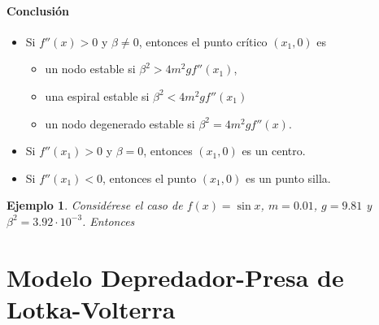 \documentclass[11pt,letterpaper,draft]{report}
\newtheorem{exa}{Ejemplo}
\newcommand\<{\langle}
\renewcommand\>{\rangle}
\begin{document}
\paragraph{Conclusión}

\begin{itemize}
  \item
    Si $f''(x)>0$ y $\beta\neq 0$,
    entonces el punto crítico $(x_1,0)$ es
    \begin{itemize}
      \item
        un nodo estable si $\beta^{2}>4m^{2}gf''(x_1)$,
      \item
        una espiral estable si $\beta^{2}<4m^{2}gf''(x_1)$
      \item
        un nodo degenerado estable si $\beta^{2}=4m^{2}gf''(x)$.
    \end{itemize}
  \item
    Si $f''(x_1)>0$ y $\beta=0$, entonces $(x_1,0)$ es un centro.
  \item
    Si $f''(x_1)<0$, entonces el punto $(x_1,0)$ es un punto silla.
\end{itemize}

\begin{exa}
  Considérese el caso de $f(x)=\sin x$, $m=0.01$, $g=9.81$ y
  $\beta^{2}=3.92\cdot 10^{-3}$.
  Entonces
\end{exa}

\section{Modelo Depredador-Presa de Lotka-Volterra}
\end{document}
